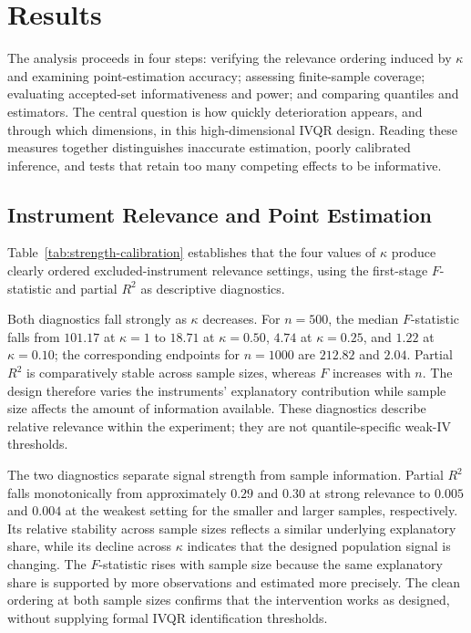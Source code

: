 \clearpage
\section{Results}
The analysis proceeds in four steps: verifying the relevance ordering induced by $\kappa$ and examining point-estimation accuracy; assessing finite-sample coverage; evaluating accepted-set informativeness and power; and comparing quantiles and estimators. The central question is how quickly deterioration appears, and through which dimensions, in this high-dimensional IVQR design. Reading these measures together distinguishes inaccurate estimation, poorly calibrated inference, and tests that retain too many competing effects to be informative.
\suppressfloats[t]

\subsection{Instrument Relevance and Point Estimation}

Table~\ref{tab:strength-calibration} establishes that the four values of $\kappa$ produce clearly ordered excluded-instrument relevance settings, using the first-stage $F$-statistic and partial $R^2$ as descriptive diagnostics.



Both diagnostics fall strongly as $\kappa$ decreases. For $n=500$, the median $F$-statistic falls from $101.17$ at $\kappa=1$ to $18.71$ at $\kappa=0.50$, $4.74$ at $\kappa=0.25$, and $1.22$ at $\kappa=0.10$; the corresponding endpoints for $n=1000$ are $212.82$ and $2.04$. Partial $R^2$ is comparatively stable across sample sizes, whereas $F$ increases with $n$. The design therefore varies the instruments' explanatory contribution while sample size affects the amount of information available. These diagnostics describe relative relevance within the experiment; they are not quantile-specific weak-IV thresholds.

The two diagnostics separate signal strength from sample information. Partial $R^2$ falls monotonically from approximately $0.29$ and $0.30$ at strong relevance to $0.005$ and $0.004$ at the weakest setting for the smaller and larger samples, respectively. Its relative stability across sample sizes reflects a similar underlying explanatory share, while its decline across $\kappa$ indicates that the designed population signal is changing. The $F$-statistic rises with sample size because the same explanatory share is supported by more observations and estimated more precisely. The clean ordering at both sample sizes confirms that the intervention works as designed, without supplying formal IVQR identification thresholds.

